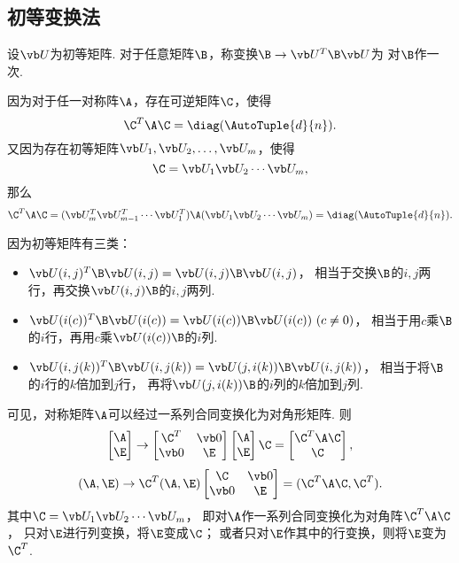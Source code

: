 \subsection{初等变换法}
\begin{definition}
设\(\P\)为初等矩阵.
对于任意矩阵\(\B\)，称变换\(\B \to \P^T\B\P\)为
对\(\B\)作一次.
\end{definition}

\begin{theorem}
因为对于任一对称阵\(\A\)，存在可逆矩阵\(\C\)，使得\[
	\C^T\A\C=\diag(\AutoTuple{d}{n}).
\]
又因为存在初等矩阵\(\P_1,\P_2,\dotsc,\P_m\)，使得\[
	\C=\P_1\P_2\dotsm\P_m,
\]
那么\[
	\C^T\A\C
	= (\P_m^T\P_{m-1}^T\dotsm\P_1^T)\A(\P_1\P_2\dotsm\P_m)
	= \diag(\AutoTuple{d}{n}).
\]

因为初等矩阵有三类：\begin{itemize}
	\item \(\P(i,j)^T\B\P(i,j)=\P(i,j)\B\P(i,j)\)，
	相当于交换\(\B\)的\(i,j\)两行，再交换\(\P(i,j)\B\)的\(i,j\)两列.
	\item \(\P(i(c))^T\B\P(i(c))=\P(i(c))\B\P(i(c))\ (c \neq 0)\)，
	相当于用\(c\)乘\(\B\)的\(i\)行，再用\(c\)乘\(\P(i(c))\B\)的\(i\)列.
	\item \(\P(i,j(k))^T\B\P(i,j(k))=\P(j,i(k))\B\P(i,j(k))\)，
	相当于将\(\B\)的\(i\)行的\(k\)倍加到\(j\)行，
	再将\(\P(j,i(k))\B\)的\(i\)列的\(k\)倍加到\(j\)列.
\end{itemize}
可见，对称矩阵\(\A\)可以经过一系列合同变换化为对角形矩阵.
则\[
	\begin{bmatrix} \A \\ \E \end{bmatrix}
	\to
	\begin{bmatrix} \C^T & \vb0 \\ \vb0 & \E \end{bmatrix}
	\begin{bmatrix} \A \\ \E \end{bmatrix}
	\C
	= \begin{bmatrix} \C^T\A\C \\ \C \end{bmatrix},
\]\[
	(\A,\E)
	\to
	\C^T (\A,\E) \begin{bmatrix}
		\C & \vb0 \\
		\vb0 & \E
	\end{bmatrix}
	= (\C^T\A\C,\C^T).
\]
其中\(\C=\P_1\P_2\dotsm\P_m\)，
即对\(\A\)作一系列合同变换化为对角阵\(\C^T\A\C\)，
只对\(\E\)进行列变换，将\(\E\)变成\(\C\)；
或者只对\(\E\)作其中的行变换，则将\(\E\)变为\(\C^T\).
\end{theorem}

